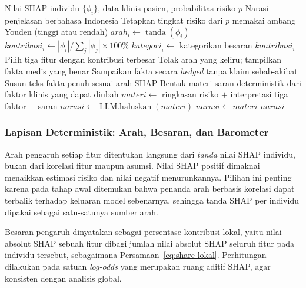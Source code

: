 \begin{algorithm}[htbp]
\caption{Penyusunan Narasi Penjelasan Berbasis Kaidah Deterministik dan LLM}
\label{alg:narasi}
\begin{algorithmic}[1]
\Require Nilai SHAP individu $\{\phi_i\}$, data klinis pasien, probabilitas risiko $p$
\Ensure Narasi penjelasan berbahasa Indonesia
\State Tetapkan tingkat risiko dari $p$ memakai ambang Youden (tinggi atau rendah)
    \State $\mathit{arah}_i \gets \operatorname{tanda}(\phi_i)$ 
    \State $\mathit{kontribusi}_i \gets |\phi_i| / \sum_{j} |\phi_j| \times 100\%$
    \State $\mathit{kategori}_i \gets$ kategorikan besaran $\mathit{kontribusi}_i$
\EndFor
\State Pilih tiga fitur dengan kontribusi terbesar
        \State Tolak arah yang keliru; tampilkan fakta medis yang benar 
        \State Sampaikan fakta secara \emph{hedged} tanpa klaim sebab-akibat
    \Else
        \State Susun teks fakta penuh sesuai arah SHAP
    \EndIf
\EndFor
\State Bentuk materi saran deterministik dari faktor klinis yang dapat diubah
\State $\mathit{materi} \gets$ ringkasan risiko $+$ interpretasi tiga faktor $+$ saran
    \State $\mathit{narasi} \gets \operatorname{LLM.haluskan}(\mathit{materi})$ 
\Else
    \State $\mathit{narasi} \gets \mathit{materi}$ 
\EndIf
\State \Return $\mathit{narasi}$
\end{algorithmic}
\end{algorithm}

\subsubsection{Lapisan Deterministik: Arah, Besaran, dan Barometer}

Arah pengaruh setiap fitur ditentukan langsung dari \emph{tanda} nilai SHAP individu, bukan dari korelasi fitur maupun asumsi. Nilai SHAP positif dimaknai menaikkan estimasi risiko dan nilai negatif menurunkannya. Pilihan ini penting karena pada tahap awal ditemukan bahwa penanda arah berbasis korelasi dapat terbalik terhadap keluaran model sebenarnya, sehingga tanda SHAP per individu dipakai sebagai satu-satunya sumber arah.

Besaran pengaruh dinyatakan sebagai persentase kontribusi lokal, yaitu nilai absolut SHAP sebuah fitur dibagi jumlah nilai absolut SHAP seluruh fitur pada individu tersebut, sebagaimana Persamaan~\eqref{eq:share-lokal}. Perhitungan dilakukan pada satuan \emph{log-odds} yang merupakan ruang aditif SHAP, agar konsisten dengan analisis global.

